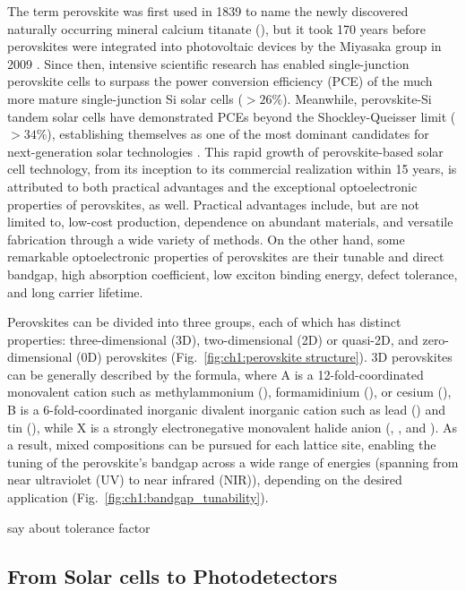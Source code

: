 The term perovskite was first used in 1839 to name the newly discovered naturally occurring mineral calcium titanate (), but it took 170 years before perovskites were integrated into photovoltaic devices by the Miyasaka group in 2009 \cite{Kojima2009OrganometalCells}. Since then, intensive scientific research has enabled single-junction perovskite cells to surpass the power conversion efficiency (PCE) of the much more mature single-junction Si solar cells ($> 26\%$). Meanwhile, perovskite-Si tandem solar cells have demonstrated PCEs beyond the Shockley-Queisser limit ($>34\%$), establishing themselves as one of the most dominant candidates for next-generation solar technologies \cite{Hasan2024StabilityReview, Noman2024ATechnology}. This rapid growth of perovskite-based solar cell technology, from its inception to its commercial realization within 15 years, is attributed to both practical advantages and the exceptional optoelectronic properties of perovskites, as well. Practical advantages include, but are not limited to, low-cost production, dependence on abundant materials, and versatile fabrication through a wide variety of methods. On the other hand, some remarkable optoelectronic properties of perovskites are their tunable and direct bandgap, high absorption coefficient, low exciton binding energy, defect tolerance, and long carrier lifetime. 

Perovskites can be divided into three groups, each of which has distinct properties: three-dimensional (3D), two-dimensional (2D) or quasi-2D, and zero-dimensional (0D) perovskites (Fig.~\ref{fig:ch1:perovskite structure}). 3D perovskites can be generally described by the  formula, where A is a 12-fold-coordinated monovalent cation such as methylammonium (), formamidinium (), or cesium (), B is a 6-fold-coordinated inorganic divalent inorganic cation such as lead () and tin (), while X is a strongly electronegative monovalent halide anion (, , and ). As a result, mixed compositions can be pursued for each lattice site, enabling the tuning of the perovskite's bandgap across a wide range of energies (spanning from near ultraviolet (UV) to near infrared (NIR)), depending on the desired application (Fig.~\ref{fig:ch1:bandgap_tunability}).

say about tolerance factor


\subsection{From Solar cells to Photodetectors}

